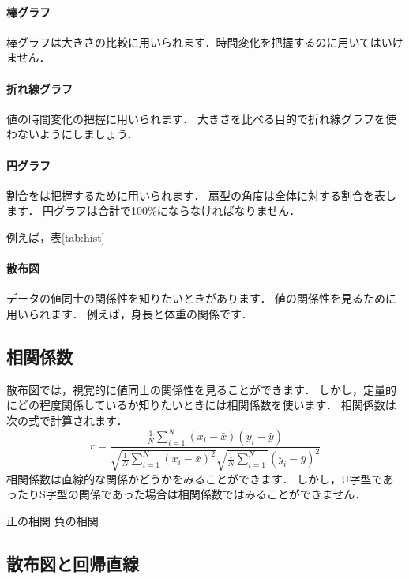 \documentclass[12pt, a4j]{jreport}
\begin{document}
\paragraph{棒グラフ}

棒グラフは大きさの比較に用いられます．時間変化を把握するのに用いてはいけません．

\paragraph{折れ線グラフ}

値の時間変化の把握に用いられます．
大きさを比べる目的で折れ線グラフを使わないようにしましょう．

\paragraph{円グラフ}

割合をは把握するために用いられます．
扇型の角度は全体に対する割合を表します．
円グラフは合計で100\%にならなければなりません．

例えば，表\ref{tab:hist}

\paragraph{散布図}

データの値同士の関係性を知りたいときがあります．
値の関係性を見るために用いられます．
例えば，身長と体重の関係です．


\subsection{相関係数}

散布図では，視覚的に値同士の関係性を見ることができます．
しかし，定量的にどの程度関係しているか知りたいときには相関係数を使います．
相関係数は次の式で計算されます．
\begin{equation}
    \label{eq:1}
    r = \frac{\frac{1}{N} \sum_{i=1}^N (x_i - \bar{x})(y_i - \bar{y})}{\sqrt{\frac{1}{N} \sum_{i=1}^N (x_i - \bar{x})^2} \sqrt{\frac{1}{N} \sum_{i=1}^N}(y_i - \bar{y})^2}
\end{equation}
相関係数は直線的な関係かどうかをみることができます．
しかし，U字型であったりS字型の関係であった場合は相関係数ではみることができません．

正の相関
負の相関

\subsection{散布図と回帰直線}
\end{document}

